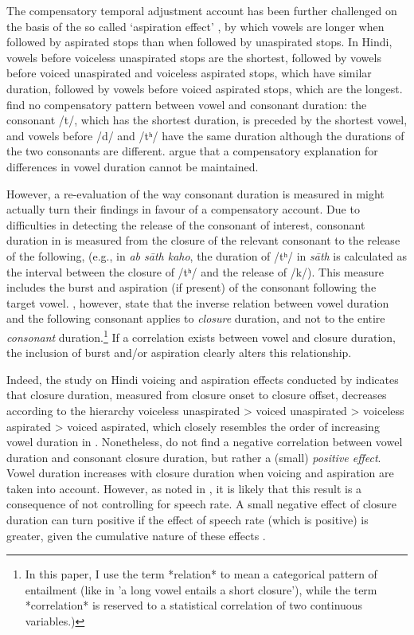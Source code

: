 \documentclass[12pt,]{article}
\let\rmarkdownfootnote\footnote%
\def\footnote{\protect\rmarkdownfootnote}
\begin{document}
The compensatory temporal adjustment account has been further challenged
on the basis of the so called `aspiration effect' \citep{maddieson1976},
by which vowels are longer when followed by aspirated stops than when
followed by unaspirated stops. In Hindi, vowels before voiceless
unaspirated stops are the shortest, followed by vowels before voiced
unaspirated and voiceless aspirated stops, which have similar duration,
followed by vowels before voiced aspirated stops, which are the longest.
\citet{maddieson1976} find no compensatory pattern between vowel and
consonant duration: the consonant /t/, which has the shortest duration,
is preceded by the shortest vowel, and vowels before /d/ and /tʰ/ have
the same duration although the durations of the two consonants are
different. \citet{maddieson1976} argue that a compensatory explanation
for differences in vowel duration cannot be maintained.

However, a re-evaluation of the way consonant duration is measured in
\citet{maddieson1976} might actually turn their findings in favour of a
compensatory account. Due to difficulties in detecting the release of
the consonant of interest, consonant duration in \citet{maddieson1976}
is measured from the closure of the relevant consonant to the release of
the following, (e.g., in \emph{ab sāth kaho}, the duration of /tʰ/ in
\emph{sāth} is calculated as the interval between the closure of /tʰ/
and the release of /k/). This measure includes the burst and aspiration
(if present) of the consonant following the target vowel.
\citet{slis1969a}, however, state that the inverse relation between
vowel duration and the following consonant applies to \emph{closure}
duration, and not to the entire \emph{consonant}
duration.\footnote{In this paper, I use the term *relation* to mean a categorical pattern of entailment (like in 'a long vowel entails a short closure'), while the term *correlation* is reserved to a statistical correlation of two continuous variables.)}
If a correlation exists between vowel and closure duration, the
inclusion of burst and/or aspiration clearly alters this relationship.

Indeed, the study on Hindi voicing and aspiration effects conducted by
\citet{durvasula2012} indicates that closure duration, measured from
closure onset to closure offset, decreases according to the hierarchy
voiceless unaspirated \textgreater{} voiced unaspirated \textgreater{}
voiceless aspirated \textgreater{} voiced aspirated, which closely
resembles the order of increasing vowel duration in
\citet{maddieson1976}. Nonetheless, \citet{durvasula2012} do not find a
negative correlation between vowel duration and consonant closure
duration, but rather a (small) \emph{positive effect}. Vowel duration
increases with closure duration when voicing and aspiration are taken
into account. However, as noted in \citet{begus2017}, it is likely that
this result is a consequence of not controlling for speech rate. A small
negative effect of closure duration can turn positive if the effect of
speech rate (which is positive) is greater, given the cumulative nature
of these effects \citep[p. 2177]{begus2017}.
\end{document}
